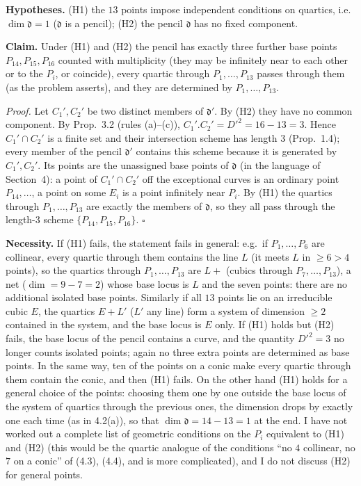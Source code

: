 \documentclass[11pt]{article}
\begin{document}
\textbf{Hypotheses.} (H1) the $13$ points impose independent conditions on quartics, i.e.\ $\dim\mathfrak d=1$ ($\mathfrak d$ is a pencil); (H2) the pencil $\mathfrak d$ has no fixed component.

\textbf{Claim.} Under (H1) and (H2) the pencil has exactly three further base points $P_{14},P_{15},P_{16}$ counted with multiplicity (they may be infinitely near to each other or to the $P_i$, or coincide), every quartic through $P_1,\dots,P_{13}$ passes through them (as the problem asserts), and they are determined by $P_1,\dots,P_{13}$.

\emph{Proof.} Let $C_1',C_2'$ be two distinct members of $\mathfrak d'$. By (H2) they have no common component. By Prop.~3.2 (rules (a)--(c)), $C_1'.C_2'=D'^2=16-13=3$. Hence $C_1'\cap C_2'$ is a finite set and their intersection scheme has length $3$ (Prop.~1.4); every member of the pencil $\mathfrak d'$ contains this scheme because it is generated by $C_1',C_2'$. Its points are the unassigned base points of $\mathfrak d$ (in the language of Section~4): a point of $C_1'\cap C_2'$ off the exceptional curves is an ordinary point $P_{14},\dots$, a point on some $E_i$ is a point infinitely near $P_i$. By (H1) the quartics through $P_1,\dots,P_{13}$ are exactly the members of $\mathfrak d$, so they all pass through the length-$3$ scheme $\{P_{14},P_{15},P_{16}\}$. \hfill$\square$

\textbf{Necessity.} If (H1) fails, the statement fails in general: e.g.\ if $P_1,\dots,P_6$ are collinear, every quartic through them contains the line $L$ (it meets $L$ in $\ge6>4$ points), so the quartics through $P_1,\dots,P_{13}$ are $L+$ (cubics through $P_7,\dots,P_{13}$), a net ($\dim=9-7=2$) whose base locus is $L$ and the seven points: there are no additional isolated base points. Similarly if all $13$ points lie on an irreducible cubic $E$, the quartics $E+L'$ ($L'$ any line) form a system of dimension $\ge2$ contained in the system, and the base locus is $E$ only. If (H1) holds but (H2) fails, the base locus of the pencil contains a curve, and the quantity $D'^2=3$ no longer counts isolated points; again no three extra points are determined as base points. In the same way, ten of the points on a conic make every quartic through them contain the conic, and then (H1) fails. On the other hand (H1) holds for a general choice of the points: choosing them one by one outside the base locus of the system of quartics through the previous ones, the dimension drops by exactly one each time (as in 4.2(a)), so that $\dim\mathfrak d=14-13=1$ at the end. I have not worked out a complete list of geometric conditions on the $P_i$ equivalent to (H1) and (H2) (this would be the quartic analogue of the conditions ``no $4$ collinear, no $7$ on a conic'' of (4.3), (4.4), and is more complicated), and I do not discuss (H2) for general points.
\end{document}
